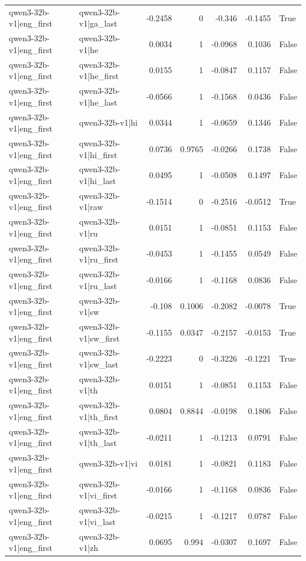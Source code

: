 \begin{table}
\begin{tabular}{l l r r r r l}
qwen3-32b-v1|eng_first & qwen3-32b-v1|ga_last & -0.2458 & 0 & -0.346 & -0.1455 & True \\
qwen3-32b-v1|eng_first & qwen3-32b-v1|he & 0.0034 & 1 & -0.0968 & 0.1036 & False \\
qwen3-32b-v1|eng_first & qwen3-32b-v1|he_first & 0.0155 & 1 & -0.0847 & 0.1157 & False \\
qwen3-32b-v1|eng_first & qwen3-32b-v1|he_last & -0.0566 & 1 & -0.1568 & 0.0436 & False \\
qwen3-32b-v1|eng_first & qwen3-32b-v1|hi & 0.0344 & 1 & -0.0659 & 0.1346 & False \\
qwen3-32b-v1|eng_first & qwen3-32b-v1|hi_first & 0.0736 & 0.9765 & -0.0266 & 0.1738 & False \\
qwen3-32b-v1|eng_first & qwen3-32b-v1|hi_last & 0.0495 & 1 & -0.0508 & 0.1497 & False \\
qwen3-32b-v1|eng_first & qwen3-32b-v1|raw & -0.1514 & 0 & -0.2516 & -0.0512 & True \\
qwen3-32b-v1|eng_first & qwen3-32b-v1|ru & 0.0151 & 1 & -0.0851 & 0.1153 & False \\
qwen3-32b-v1|eng_first & qwen3-32b-v1|ru_first & -0.0453 & 1 & -0.1455 & 0.0549 & False \\
qwen3-32b-v1|eng_first & qwen3-32b-v1|ru_last & -0.0166 & 1 & -0.1168 & 0.0836 & False \\
qwen3-32b-v1|eng_first & qwen3-32b-v1|sw & -0.108 & 0.1006 & -0.2082 & -0.0078 & True \\
qwen3-32b-v1|eng_first & qwen3-32b-v1|sw_first & -0.1155 & 0.0347 & -0.2157 & -0.0153 & True \\
qwen3-32b-v1|eng_first & qwen3-32b-v1|sw_last & -0.2223 & 0 & -0.3226 & -0.1221 & True \\
qwen3-32b-v1|eng_first & qwen3-32b-v1|th & 0.0151 & 1 & -0.0851 & 0.1153 & False \\
qwen3-32b-v1|eng_first & qwen3-32b-v1|th_first & 0.0804 & 0.8844 & -0.0198 & 0.1806 & False \\
qwen3-32b-v1|eng_first & qwen3-32b-v1|th_last & -0.0211 & 1 & -0.1213 & 0.0791 & False \\
qwen3-32b-v1|eng_first & qwen3-32b-v1|vi & 0.0181 & 1 & -0.0821 & 0.1183 & False \\
qwen3-32b-v1|eng_first & qwen3-32b-v1|vi_first & -0.0166 & 1 & -0.1168 & 0.0836 & False \\
qwen3-32b-v1|eng_first & qwen3-32b-v1|vi_last & -0.0215 & 1 & -0.1217 & 0.0787 & False \\
qwen3-32b-v1|eng_first & qwen3-32b-v1|zh & 0.0695 & 0.994 & -0.0307 & 0.1697 & False \\

\end{tabular}
\end{table}
